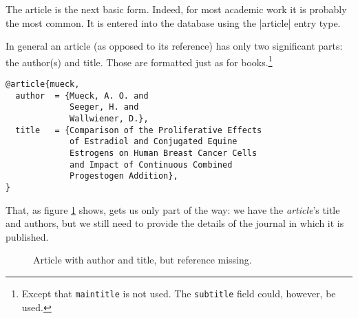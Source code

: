 The article is the next basic form. Indeed, for most academic work it
is probably the most common. It is entered into the database using the
|article| entry type.

In general an article (as opposed to its reference) has only two
significant parts: the author(s) and title. Those are formatted just
as for books.\footnote{Except that \texttt{maintitle} is not used. The
  \texttt{subtitle} field could, however, be used.}
\begin{Verbatim}
@article{mueck,
  author  = {Mueck, A. O. and
             Seeger, H. and
             Wallwiener, D.},
  title   = {Comparison of the Proliferative Effects
             of Estradiol and Conjugated Equine
             Estrogens on Human Breast Cancer Cells
             and Impact of Continuous Combined
             Progestogen Addition},
}
\end{Verbatim}

That, as figure \ref{mueck} shows, gets us only part of the way: we
have the \emph{article}'s title and authors, but we still need to
provide the details of the journal in which it is published.

\begin{figure}
\caption{Article with author and title, but reference missing.\label{mueck}}
\end{figure}

